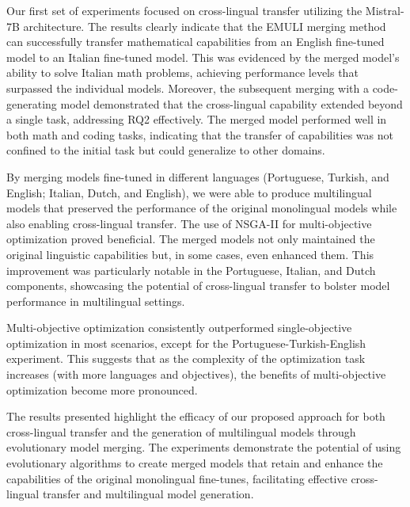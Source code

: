 
Our first set of experiments focused on cross-lingual transfer utilizing the Mistral-7B architecture. The results clearly indicate that the EMULI merging method can successfully transfer mathematical capabilities from an English fine-tuned model to an Italian fine-tuned model. This was evidenced by the merged model's ability to solve Italian math problems, achieving performance levels that surpassed the individual models. Moreover, the subsequent merging with a code-generating model demonstrated that the cross-lingual capability extended beyond a single task, addressing RQ2 effectively. The merged model performed well in both math and coding tasks, indicating that the transfer of capabilities was not confined to the initial task but could generalize to other domains.



By merging models fine-tuned in different languages (Portuguese, Turkish, and English; Italian, Dutch, and English), we were able to produce multilingual models that preserved the performance of the original monolingual models while also enabling cross-lingual transfer. The use of NSGA-II for multi-objective optimization proved beneficial. The merged models not only maintained the original linguistic capabilities but, in some cases, even enhanced them. This improvement was particularly notable in the Portuguese, Italian, and Dutch components, showcasing the potential of cross-lingual transfer to bolster model performance in multilingual settings.


Multi-objective optimization consistently outperformed single-objective optimization in most scenarios, except for the Portuguese-Turkish-English experiment. This suggests that as the complexity of the optimization task increases (with more languages and objectives), the benefits of multi-objective optimization become more pronounced.


The results presented highlight the efficacy of our proposed approach for both cross-lingual transfer and the generation of multilingual models through evolutionary model merging. The experiments demonstrate the potential of using evolutionary algorithms to create merged models that retain and enhance the capabilities of the original monolingual fine-tunes, facilitating effective cross-lingual transfer and multilingual model generation.


